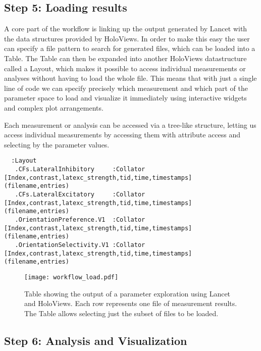 \subsection{Step 5: Loading results}

A core part of the workflow is linking up the output generated by
Lancet with the data structures provided by HoloViews. In order to
make this easy the user can specify a file pattern to search for
generated files, which can be loaded into a Table. The Table can then
be expanded into another HoloViews datastructure called a Layout,
which makes it possible to access individual measurements or analyses
without having to load the whole file. This means that with just a
single line of code we can specify precisely which measurement and
which part of the parameter space to load and visualize it immediately
using interactive widgets and complex plot arrangements.

Each measurement or analysis can be accessed via a tree-like
structure, letting us access individual measurements by accessing them
with attribute access and selecting by the parameter values.

\begin{minipage}{\linewidth}
\begin{lstlisting}
  :Layout
   .CFs.LateralInhibitory     :Collator   [Index,contrast,latexc_strength,tid,time,timestamps]   (filename,entries)
   .CFs.LateralExcitatory     :Collator   [Index,contrast,latexc_strength,tid,time,timestamps]   (filename,entries)
   .OrientationPreference.V1  :Collator   [Index,contrast,latexc_strength,tid,time,timestamps]   (filename,entries)
   .OrientationSelectivity.V1 :Collator   [Index,contrast,latexc_strength,tid,time,timestamps]   (filename,entries)
\end{lstlisting}
\end{minipage}


\begin{figure}
	\centering
        \texttt{[image: workflow\_load.pdf]}
	    \caption[Table summarizing results from parameter analysis in
          Lancet and HoloViews.]{Table showing the output of a
          parameter exploration using Lancet and HoloViews. Each row
          represents one file of measurement results. The Table allows
          selecting just the subset of files to be loaded.}
	\label{workflow_load}
\end{figure}


\subsection{Step 6: Analysis and Visualization}

